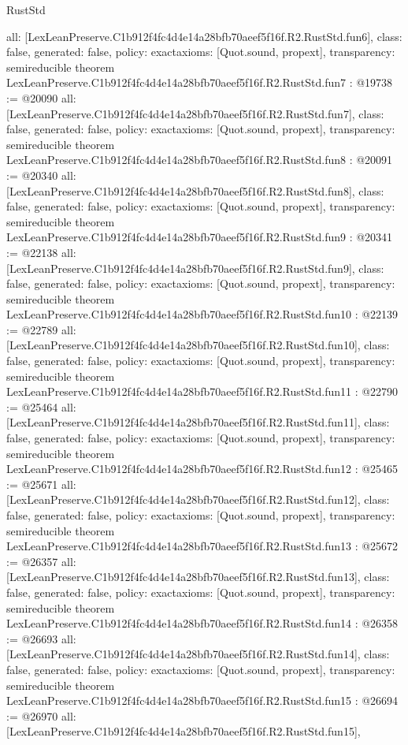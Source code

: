 \begin{lexlean}{RustStd}
\begin{coremodule}
{  all: [LexLeanPreserve.C1b912f4fc4d4e14a28bfb70aeef5f16f.R2.RustStd.fun6],
  class: false,
  generated: false,
  policy: exact{axioms: [Quot.sound, propext]},
  transparency: semireducible
}
theorem LexLeanPreserve.C1b912f4fc4d4e14a28bfb70aeef5f16f.R2.RustStd.fun7 : @19738 := @20090 {
  all: [LexLeanPreserve.C1b912f4fc4d4e14a28bfb70aeef5f16f.R2.RustStd.fun7],
  class: false,
  generated: false,
  policy: exact{axioms: [Quot.sound, propext]},
  transparency: semireducible
}
theorem LexLeanPreserve.C1b912f4fc4d4e14a28bfb70aeef5f16f.R2.RustStd.fun8 : @20091 := @20340 {
  all: [LexLeanPreserve.C1b912f4fc4d4e14a28bfb70aeef5f16f.R2.RustStd.fun8],
  class: false,
  generated: false,
  policy: exact{axioms: [Quot.sound, propext]},
  transparency: semireducible
}
theorem LexLeanPreserve.C1b912f4fc4d4e14a28bfb70aeef5f16f.R2.RustStd.fun9 : @20341 := @22138 {
  all: [LexLeanPreserve.C1b912f4fc4d4e14a28bfb70aeef5f16f.R2.RustStd.fun9],
  class: false,
  generated: false,
  policy: exact{axioms: [Quot.sound, propext]},
  transparency: semireducible
}
theorem LexLeanPreserve.C1b912f4fc4d4e14a28bfb70aeef5f16f.R2.RustStd.fun10 : @22139 := @22789 {
  all: [LexLeanPreserve.C1b912f4fc4d4e14a28bfb70aeef5f16f.R2.RustStd.fun10],
  class: false,
  generated: false,
  policy: exact{axioms: [Quot.sound, propext]},
  transparency: semireducible
}
theorem LexLeanPreserve.C1b912f4fc4d4e14a28bfb70aeef5f16f.R2.RustStd.fun11 : @22790 := @25464 {
  all: [LexLeanPreserve.C1b912f4fc4d4e14a28bfb70aeef5f16f.R2.RustStd.fun11],
  class: false,
  generated: false,
  policy: exact{axioms: [Quot.sound, propext]},
  transparency: semireducible
}
theorem LexLeanPreserve.C1b912f4fc4d4e14a28bfb70aeef5f16f.R2.RustStd.fun12 : @25465 := @25671 {
  all: [LexLeanPreserve.C1b912f4fc4d4e14a28bfb70aeef5f16f.R2.RustStd.fun12],
  class: false,
  generated: false,
  policy: exact{axioms: [Quot.sound, propext]},
  transparency: semireducible
}
theorem LexLeanPreserve.C1b912f4fc4d4e14a28bfb70aeef5f16f.R2.RustStd.fun13 : @25672 := @26357 {
  all: [LexLeanPreserve.C1b912f4fc4d4e14a28bfb70aeef5f16f.R2.RustStd.fun13],
  class: false,
  generated: false,
  policy: exact{axioms: [Quot.sound, propext]},
  transparency: semireducible
}
theorem LexLeanPreserve.C1b912f4fc4d4e14a28bfb70aeef5f16f.R2.RustStd.fun14 : @26358 := @26693 {
  all: [LexLeanPreserve.C1b912f4fc4d4e14a28bfb70aeef5f16f.R2.RustStd.fun14],
  class: false,
  generated: false,
  policy: exact{axioms: [Quot.sound, propext]},
  transparency: semireducible
}
theorem LexLeanPreserve.C1b912f4fc4d4e14a28bfb70aeef5f16f.R2.RustStd.fun15 : @26694 := @26970 {
  all: [LexLeanPreserve.C1b912f4fc4d4e14a28bfb70aeef5f16f.R2.RustStd.fun15],
}
\end{coremodule}
\end{lexlean}
